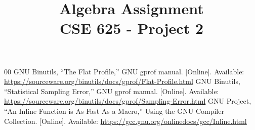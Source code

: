 \documentclass[conference]{IEEEtran}
\begin{document}
\title{Algebra Assignment \\
CSE 625 - Project 2}

\author{
\and
{}
}

\maketitle

\begin{abstract}

\end{abstract}






\begin{thebibliography}{00}
 GNU Binutils, ``The Flat Profile,'' GNU gprof manual. [Online]. Available: \url{https://sourceware.org/binutils/docs/gprof/Flat-Profile.html}
 GNU Binutils, ``Statistical Sampling Error,'' GNU gprof manual. [Online]. Available: \url{https://sourceware.org/binutils/docs/gprof/Sampling-Error.html}
 GNU Project, ``An Inline Function is As Fast As a Macro,'' Using the GNU Compiler Collection. [Online]. Available: \url{https://gcc.gnu.org/onlinedocs/gcc/Inline.html}
\end{thebibliography}
\end{document}
